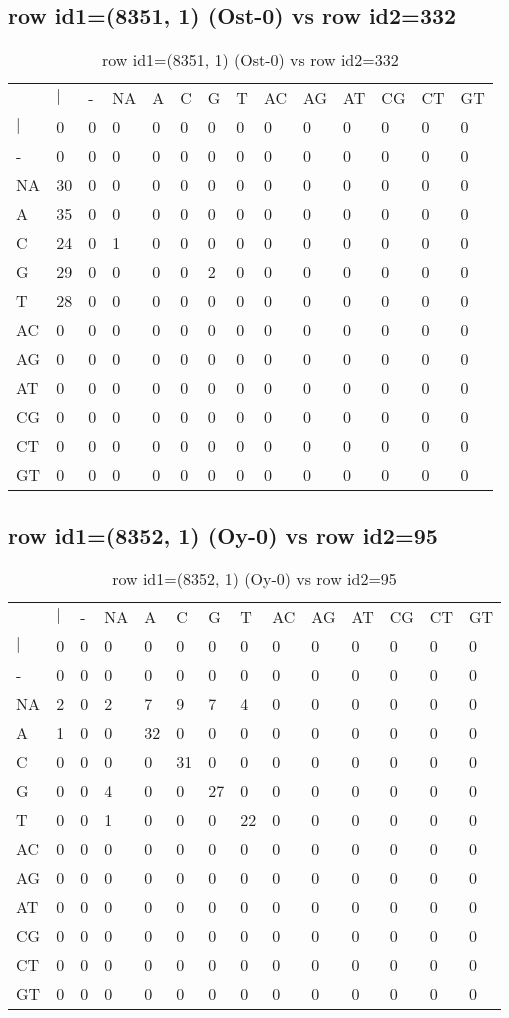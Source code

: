 \subsection{row id1=(8351, 1) (Ost-0) vs row id2=332}
\begin{center}
\begin{longtable}{|l|l|l|l|l|l|l|l|l|l|l|l|l|l|}
\caption{row id1=(8351, 1) (Ost-0) vs row id2=332} \label{table_dm374}\\
\hline
\\
\hline
&$|$&-&NA&A&C&G&T&AC&AG&AT&CG&CT&GT\\
$|$&0&0&0&0&0&0&0&0&0&0&0&0&0\\
-&0&0&0&0&0&0&0&0&0&0&0&0&0\\
NA&30&0&0&0&0&0&0&0&0&0&0&0&0\\
A&35&0&0&0&0&0&0&0&0&0&0&0&0\\
C&24&0&1&0&0&0&0&0&0&0&0&0&0\\
G&29&0&0&0&0&2&0&0&0&0&0&0&0\\
T&28&0&0&0&0&0&0&0&0&0&0&0&0\\
AC&0&0&0&0&0&0&0&0&0&0&0&0&0\\
AG&0&0&0&0&0&0&0&0&0&0&0&0&0\\
AT&0&0&0&0&0&0&0&0&0&0&0&0&0\\
CG&0&0&0&0&0&0&0&0&0&0&0&0&0\\
CT&0&0&0&0&0&0&0&0&0&0&0&0&0\\
GT&0&0&0&0&0&0&0&0&0&0&0&0&0\\
\hline
\end{longtable}
\end{center}

\subsection{row id1=(8352, 1) (Oy-0) vs row id2=95}
\begin{center}
\begin{longtable}{|l|l|l|l|l|l|l|l|l|l|l|l|l|l|}
\caption{row id1=(8352, 1) (Oy-0) vs row id2=95} \label{table_dm376}\\
\hline
\\
\hline
&$|$&-&NA&A&C&G&T&AC&AG&AT&CG&CT&GT\\
$|$&0&0&0&0&0&0&0&0&0&0&0&0&0\\
-&0&0&0&0&0&0&0&0&0&0&0&0&0\\
NA&2&0&2&7&9&7&4&0&0&0&0&0&0\\
A&1&0&0&32&0&0&0&0&0&0&0&0&0\\
C&0&0&0&0&31&0&0&0&0&0&0&0&0\\
G&0&0&4&0&0&27&0&0&0&0&0&0&0\\
T&0&0&1&0&0&0&22&0&0&0&0&0&0\\
AC&0&0&0&0&0&0&0&0&0&0&0&0&0\\
AG&0&0&0&0&0&0&0&0&0&0&0&0&0\\
AT&0&0&0&0&0&0&0&0&0&0&0&0&0\\
CG&0&0&0&0&0&0&0&0&0&0&0&0&0\\
CT&0&0&0&0&0&0&0&0&0&0&0&0&0\\
GT&0&0&0&0&0&0&0&0&0&0&0&0&0\\
\hline
\end{longtable}
\end{center}

